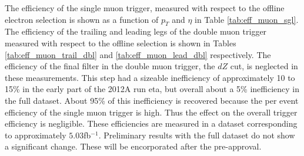 %
%

The efficiency of the single muon trigger, measured
with respect to the offline electron selection is shown
as a function of $p_T$ and $\eta$ in Table \ref{tab:eff_muon_sgl}.
The efficiency of the trailing and leading legs of the double muon trigger
measured with respect to the offline selection is shown
in Tables \ref{tab:eff_muon_trail_dbl} and \ref{tab:eff_muon_lead_dbl} respectively.
The efficiency of the final filter in the double muon trigger, the $dZ$ cut,
is neglected in these measurements.  This step had a sizeable inefficiency of
approximately 10 to 15\% in the early part of the 2012A run eta, but
overall about a 5\% inefficiency in the full dataset.
About 95\% of this inefficiency is recovered
because the per event efficiency of the single muon trigger is high.
Thus the effect on the overall trigger efficiency is negligible.
These efficiencies are measured in a dataset corresponding
to approximately $5.03$fb$^{-1}$.
Preliminary results with
the full dataset do not show a significant change. These will be encorporated
after the pre-approval.

